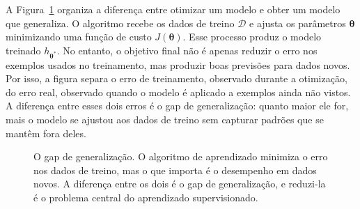 \documentclass[12pt,a4paper]{article}
\begin{document}
A Figura~\ref{fig:generalizacao} organiza a diferença entre otimizar um modelo e obter um modelo que generaliza. O algoritmo recebe os dados de treino $\mathcal{D}$ e ajusta os parâmetros $\boldsymbol{\theta}$ minimizando uma função de custo $J(\boldsymbol{\theta})$. Esse processo produz o modelo treinado $h_{\boldsymbol{\theta}^*}$. No entanto, o objetivo final não é apenas reduzir o erro nos exemplos usados no treinamento, mas produzir boas previsões para dados novos. Por isso, a figura separa o erro de treinamento, observado durante a otimização, do erro real, observado quando o modelo é aplicado a exemplos ainda não vistos. A diferença entre esses dois erros é o gap de generalização: quanto maior ele for, mais o modelo se ajustou aos dados de treino sem capturar padrões que se mantêm fora deles.

\begin{figure}[ht]
\centering
{}
\caption{O gap de generalização. O algoritmo de aprendizado minimiza o erro nos dados de treino, mas o que importa é o desempenho em dados novos. A diferença entre os dois é o gap de generalização, e reduzi-la é o problema central do aprendizado supervisionado.}
\label{fig:generalizacao}
\end{figure}
\end{document}
